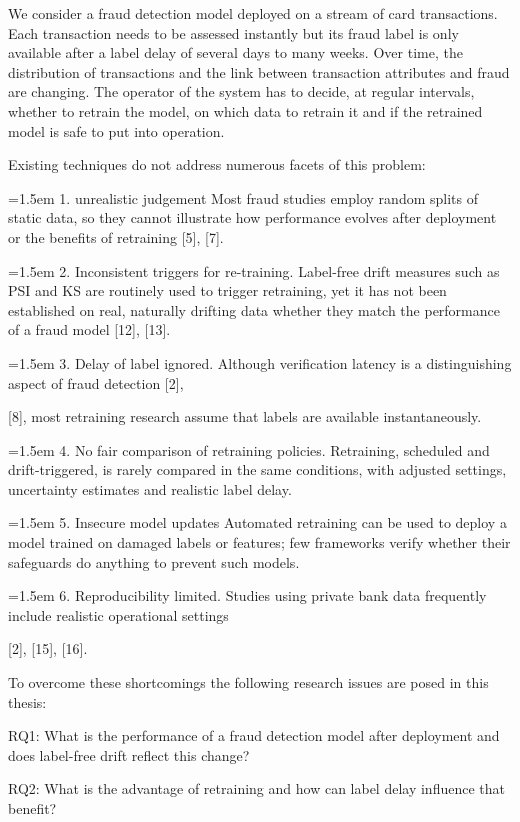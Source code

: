 \documentclass[11pt,letterpaper]{report}
\newcommand{\listitem}[1]{\par\hangindent=1.5em\hangafter=1 #1\par}
\begin{document}
We consider a fraud detection model deployed on a stream of card transactions. Each transaction needs to be assessed instantly but its fraud label is only available after a label delay of several days to many weeks. Over time, the distribution of transactions and the link between transaction attributes and fraud are changing. The operator of the system has to decide, at regular intervals, whether to retrain the model, on which data to retrain it and if the retrained model is safe to put into operation.

Existing techniques do not address numerous facets of this problem:

\listitem{1. unrealistic judgement Most fraud studies employ random splits of static data, so they cannot illustrate how performance evolves after deployment or the benefits of retraining [5], [7].}

\listitem{2. Inconsistent triggers for re-training. Label-free drift measures such as PSI and KS are routinely used to trigger retraining, yet it has not been established on real, naturally drifting data whether they match the performance of a fraud model [12], [13].}

\listitem{3. Delay of label ignored. Although verification latency is a distinguishing aspect of fraud detection [2],}

[8], most retraining research assume that labels are available instantaneously.

\listitem{4. No fair comparison of retraining policies. Retraining, scheduled and drift-triggered, is rarely compared in the same conditions, with adjusted settings, uncertainty estimates and realistic label delay.}

\listitem{5. Insecure model updates Automated retraining can be used to deploy a model trained on damaged labels or features; few frameworks verify whether their safeguards do anything to prevent such models.}

\listitem{6. Reproducibility limited. Studies using private bank data frequently include realistic operational settings}

[2], [15], [16].

To overcome these shortcomings the following research issues are posed in this thesis:

RQ1: What is the performance of a fraud detection model after deployment and does label-free drift reflect this change?

RQ2: What is the advantage of retraining and how can label delay influence that benefit?
\end{document}
